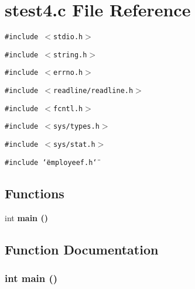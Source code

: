 \section{stest4.c File Reference}
\label{stest4_8c}
{\tt \#include $<$stdio.h$>$}\par
{\tt \#include $<$string.h$>$}\par
{\tt \#include $<$errno.h$>$}\par
{\tt \#include $<$readline/readline.h$>$}\par
{\tt \#include $<$fcntl.h$>$}\par
{\tt \#include $<$sys/types.h$>$}\par
{\tt \#include $<$sys/stat.h$>$}\par
{\tt \#include \char`\"{}employeef.h\char`\"{}}\par
\subsection*{Functions}
\begin{CompactItemize}
\item 
int \bf{main} ()
\end{CompactItemize}


\subsection{Function Documentation}
\subsubsection{\setlength{\rightskip}{0pt plus 5cm}int main ()}\label{stest4_8c_446c6b9a1a4dbab517fbb760870458a3}


